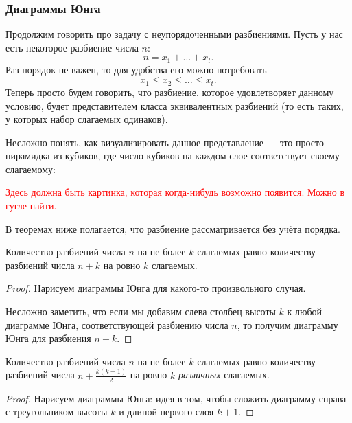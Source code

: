 \subsubsection*{Диаграммы Юнга}

Продолжим говорить про задачу с неупорядоченными разбиениями. Пусть у нас есть некоторое разбиение числа $n$:
\[
	n = x_1 + \ldots + x_t.
\]
Раз порядок не важен, то для удобства его можно потребовать
\[
	x_1 \le x_2 \le \ldots \le x_t.
\]
Теперь просто будем говорить, что разбиение, которое удовлетворяет данному условию, будет представителем класса эквивалентных разбиений (то есть таких, у которых набор слагаемых одинаков).

Несложно понять, как визуализировать данное представление --- это просто пирамидка из кубиков, где число кубиков на каждом слое соответствует своему слагаемому:

\textcolor{red}{Здесь должна быть картинка, которая когда-нибудь возможно появится. Можно в гугле найти.}

\begin{note}
	В теоремах ниже полагается, что разбиение рассматривается без учёта порядка.
\end{note}

\begin{theorem}
	Количество разбиений числа $n$ на не более $k$ слагаемых равно количеству разбиений числа $n + k$ на ровно $k$ слагаемых.
\end{theorem}

\begin{proof}
	Нарисуем диаграммы Юнга для какого-то произвольного случая.
	
	Несложно заметить, что если мы добавим слева столбец высоты $k$ к любой диаграмме Юнга, соответствующей разбиению числа $n$, то получим диаграмму Юнга для разбиения $n + k$.
\end{proof}

\begin{theorem}
	Количество разбиений числа $n$ на не более $k$ слагаемых равно количеству разбиений числа $n + \frac{k(k + 1)}{2}$ на ровно $k$ \textit{различных} слагаемых.
\end{theorem}

\begin{proof}
	Нарисуем диаграммы Юнга:
	идея в том, чтобы сложить диаграмму справа с треугольником высоты $k$ и длиной первого слоя $k + 1$.
\end{proof}

